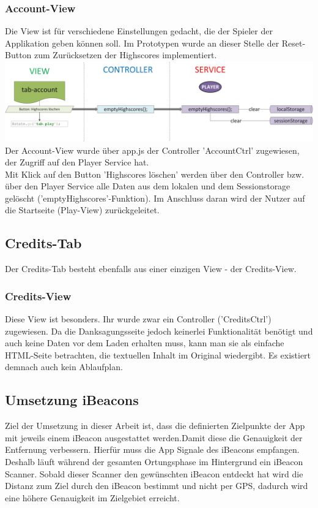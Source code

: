 \subsubsection{Account-View}
%
%
Die View ist für verschiedene Einstellungen gedacht, die der Spieler der Applikation geben können soll. Im Prototypen wurde an dieser Stelle der Reset-Button zum Zurücksetzen der Highscores implementiert.
%
%
\\ \includegraphics[width=1\textwidth]{ref/images/07-account-tab.png} \\
%
%
Der Account-View wurde über app.js der Controller 'AccountCtrl' zugewiesen, der Zugriff auf den Player Service hat.
\\
Mit Klick auf den Button 'Highscores löschen' werden über den Controller bzw. über den Player Service alle Daten aus dem lokalen und dem Sessionstorage gelöscht ('emptyHighscores'-Funktion). Im Anschluss daran wird der Nutzer auf die Startseite (Play-View) zurückgeleitet.
\subsection{Credits-Tab}
Der Credits-Tab besteht ebenfalls aus einer einzigen View - der Credits-View.
\subsubsection{Credits-View}
%
%
Diese View ist besonders. Ihr wurde zwar ein Controller ('CreditsCtrl') zugewiesen. Da die Danksagungsseite jedoch keinerlei Funktionalität benötigt und auch keine Daten vor dem Laden erhalten muss, kann man sie als einfache HTML-Seite betrachten, die textuellen Inhalt im Original wiedergibt. Es existiert demnach auch kein Ablaufplan.
\subsection{Umsetzung iBeacons}
Ziel der Umsetzung in dieser Arbeit ist, dass die definierten Zielpunkte der App mit jeweils einem iBeacon ausgestattet werden.Damit diese die Genauigkeit der Entfernung verbessern.
Hierfür muss die App Signale des iBeacons empfangen. Deshalb läuft während der gesamten Ortungsphase im Hintergrund ein iBeacon Scanner. Sobald dieser Scanner den gewünschten iBeacon entdeckt hat wird die Distanz zum Ziel durch den iBeacon bestimmt und nicht per GPS, dadurch wird eine höhere Genauigkeit im Zielgebiet erreicht.

